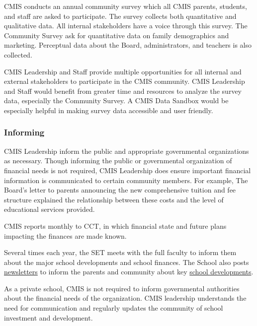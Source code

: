 \begin{findings}
CMIS  conducts an annual community survey which all CMIS parents, students, and staff are asked to participate. The survey collects both quantitative and qualitative data. All internal stakeholders have a voice through this survey. The Community Survey ask for quantitative data on family demographics and marketing. Perceptual data about the Board, administrators, and teachers is also collected.  


CMIS Leadership and Staff provide multiple opportunities for all internal and external stakeholders to participate in the CMIS community. CMIS Leadership and Staff would benefit from greater time and resources to analyze the survey data, especially the Community Survey. A CMIS Data Sandbox would be especially helpful in making survey data accessible and user friendly. 
\end{findings}

\subsubsection{Informing}



\begin{findings}
CMIS Leadership inform the public and appropriate governmental organizations as necessary. Though informing the public or governmental organization of financial needs is not required, CMIS Leadership does ensure important financial information is communicated to certain community members.  
For example, The Board’s letter to parents announcing the new comprehensive tuition and fee structure explained the relationship between these costs and the level of educational services provided.

CMIS reports monthly to CCT, in which financial state and future plans impacting the finances are made known.

Several times each year, the SET meets with the full faculty to inform them about the major school developments and school finances. The School also posts \href{http://blogs.cmis.ac.th/newsletter/}{newsletters} to inform the parents and community about key \href{https://docs.google.com/document/d/1ksBWJ56c42PXtYU3laOebWdo_Jz3J56XZAKVm8s_Lpg/edit}{school developments}.


As a private school, CMIS is not required to inform governmental authorities about the financial needs of the organization. CMIS leadership understands the need for communication and regularly updates the community of school investment and development.
\end{findings}

